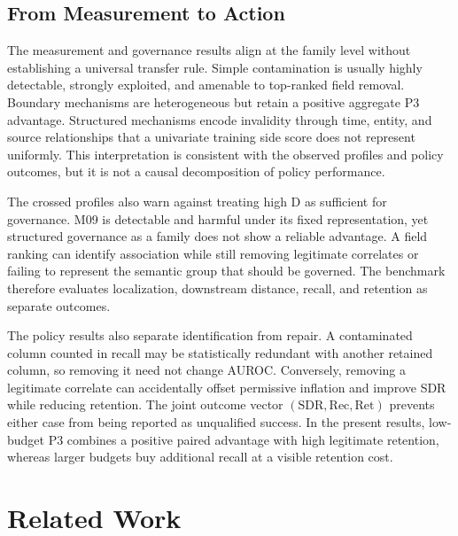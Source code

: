 \documentclass[sigconf,review]{acmart}
\begin{document}


\subsection{From Measurement to Action}

The measurement and governance results align at the family level without
establishing a universal transfer rule. Simple contamination is usually highly
detectable, strongly exploited, and amenable to top-ranked field removal.
Boundary mechanisms are heterogeneous but retain a positive aggregate P3
advantage. Structured mechanisms encode invalidity through time, entity, and
source relationships that a univariate training side score does not represent
uniformly. This interpretation is consistent with the observed profiles and
policy outcomes, but it is not a causal decomposition of policy performance.

The crossed profiles also warn against treating high D as sufficient for
governance. M09 is detectable and harmful under its fixed representation, yet
structured governance as a family does not show a reliable advantage. A field
ranking can identify association while still removing legitimate correlates or
failing to represent the semantic group that should be governed. The benchmark
therefore evaluates localization, downstream distance, recall, and retention
as separate outcomes.

The policy results also separate identification from repair. A contaminated
column counted in recall may be statistically redundant with another retained
column, so removing it need not change AUROC. Conversely, removing a legitimate
correlate can accidentally offset permissive inflation and improve SDR while
reducing retention. The joint outcome vector
$(\mathrm{SDR},\mathrm{Rec},\mathrm{Ret})$ prevents either case from being
reported as unqualified success. In the present results, low-budget P3 combines
a positive paired advantage with high legitimate retention, whereas larger
budgets buy additional recall at a visible retention cost.

\section{Related Work}
\end{document}
